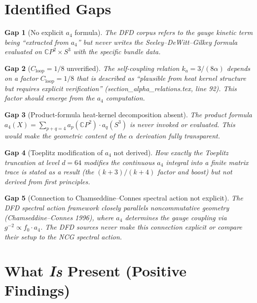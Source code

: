 \documentclass[11pt,a4paper]{article}
\newtheorem{gap}{Gap}
\begin{document}
\section{Identified Gaps}

\begin{gap}[No explicit $a_4$ formula]
The DFD corpus refers to the gauge kinetic term being ``extracted from $a_4$''
but never writes the Seeley--DeWitt--Gilkey formula evaluated on
$\mathbb{C}P^2 \times S^3$ with the specific bundle data.
\end{gap}

\begin{gap}[$C_{\mathrm{loop}} = 1/8$ unverified]
The self-coupling relation $k_a = 3/(8\alpha)$ depends on a factor
$C_{\mathrm{loop}} = 1/8$ that is described as ``plausible from heat kernel
structure but requires explicit verification'' (section\_alpha\_relations.tex,
line 92).  This factor should emerge from the $a_4$ computation.
\end{gap}

\begin{gap}[Product-formula heat-kernel decomposition absent]
The product formula $a_4(X) = \sum_{p+q=4} a_p(\mathbb{C}P^2) \cdot a_q(S^3)$
is never invoked or evaluated.  This would make the geometric content of the
$\alpha$ derivation fully transparent.
\end{gap}

\begin{gap}[Toeplitz modification of $a_4$ not derived]
How exactly the Toeplitz truncation at level $d = 64$ modifies the continuous
$a_4$ integral into a finite matrix trace is stated as a result (the
$(k+3)/(k+4)$ factor and boost) but not derived from first principles.
\end{gap}

\begin{gap}[Connection to Chamseddine--Connes spectral action not explicit]
The DFD spectral action framework closely parallels noncommutative geometry
(Chamseddine--Connes 1996), where $a_4$ determines the gauge coupling via
$g^{-2} \propto f_0 \cdot a_4$.  The DFD sources never make this connection
explicit or compare their setup to the NCG spectral action.
\end{gap}

\section{What \emph{Is} Present (Positive Findings)}
\end{document}
